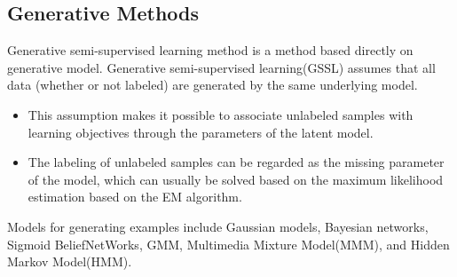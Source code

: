 \documentclass[11pt,en]{elegantpaper}
\begin{document}
\subsection{Generative Methods}
Generative semi-supervised learning method is a method based directly on generative model. Generative semi-supervised learning(GSSL) assumes that all data (whether or not labeled) are generated by the same underlying model.
\begin{itemize}
	\item This assumption makes it possible to associate unlabeled samples with learning objectives through the parameters of the latent model.
	\item The labeling of unlabeled samples can be regarded as the missing parameter of the model, which can usually be solved based on the maximum likelihood estimation based on the EM algorithm.
\end{itemize}
Models\cite{li2020mixture} for generating examples include Gaussian models, Bayesian networks, Sigmoid BeliefNetWorks, GMM, Multimedia Mixture Model(MMM), and Hidden Markov Model(HMM).
\end{document}
